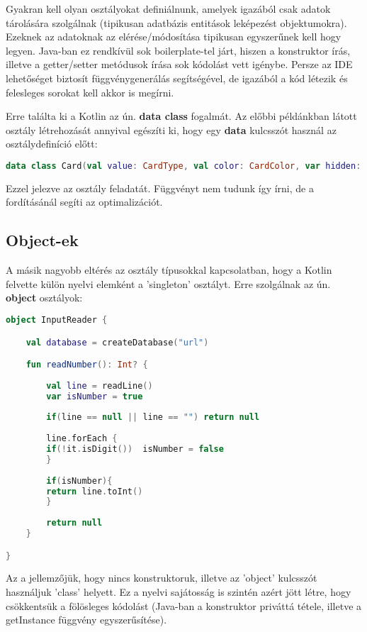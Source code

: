 Gyakran kell olyan osztályokat definiálnunk, amelyek igazából csak adatok tárolására szolgálnak (tipikusan adatbázis entitások leképezést objektumokra). Ezeknek az adatoknak az elérése/módosítása tipikusan egyszerűnek kell hogy legyen. Java-ban ez rendkívül sok boilerplate-tel járt, hiszen a konstruktor írás, illetve a getter/setter metódusok írása sok kódolást vett igénybe. Persze az IDE lehetőséget biztosít függvénygenerálás segítségével, de igazából a kód létezik és felesleges sorokat kell akkor is megírni. 

Erre találta ki a Kotlin az ún. \textbf{data class} fogalmát. Az előbbi példánkban látott osztály létrehozását annyival egészíti ki, hogy egy \textbf{data} kulcsszót használ az osztálydefiníció előtt:
\scriptsize
\begin{lstlisting}[language = Kotlin]
data class Card(val value: CardType, val color: CardColor, var hidden: Boolean = false)
\end{lstlisting}
\normalsize
Ezzel jelezve az osztály feladatát. Függvényt nem tudunk így írni, de a fordításánál segíti az optimalizációt.

\subsection{Object-ek}
\label{subsec:k_obj}

A másik nagyobb eltérés az osztály típusokkal kapcsolatban, hogy a Kotlin felvette külön nyelvi elemként a 'singleton' osztályt. Erre szolgálnak az ún. \textbf{object} osztályok:
\scriptsize
\begin{lstlisting}[language = Kotlin]
object InputReader {

	val database = createDatabase("url")

	fun readNumber(): Int? {
	
		val line = readLine()
		var isNumber = true
		
		if(line == null || line == "") return null
		
		line.forEach {
		if(!it.isDigit())  isNumber = false
		}
		
		if(isNumber){
		return line.toInt()
		}
		
		return null
	}

}
\end{lstlisting}
\normalsize
Az a jellemzőjük, hogy nincs konstruktoruk, illetve az 'object' kulcsszót használjuk 'class' helyett. Ez a nyelvi sajátosság is szintén azért jött létre, hogy csökkentsük a fölösleges kódolást (Java-ban a konstruktor priváttá tétele, illetve a getInstance függvény egyszerűsítése). 

